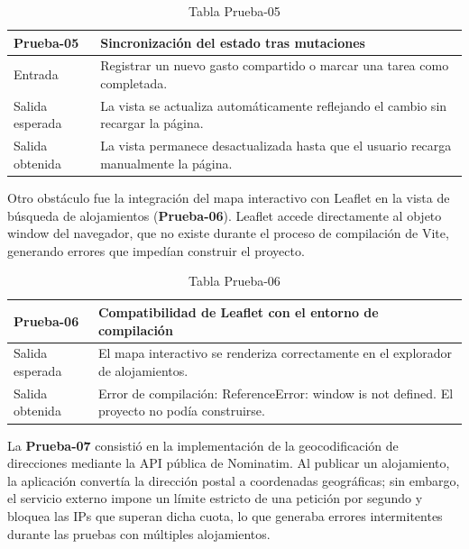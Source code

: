 \begin{table}[H]
\centering
\begin{tabular}{|p{}|p{}|}
\hline
\textbf{Prueba-05} & \textbf{Sincronización del estado tras mutaciones} \\ \hline
Entrada & Registrar un nuevo gasto compartido o marcar una tarea como completada. \\ \hline
Salida esperada & La vista se actualiza automáticamente reflejando el cambio sin recargar la página. \\ \hline
Salida obtenida & La vista permanece desactualizada hasta que el usuario recarga manualmente la página. \\ \hline
\end{tabular}
\caption{Tabla Prueba-05}
\label{tab:prueba05}
\end{table}

Otro obstáculo fue la integración del mapa interactivo con Leaflet en la vista de búsqueda de alojamientos (\textbf{Prueba-06}). Leaflet accede directamente al objeto window del navegador, que no existe durante el proceso de compilación de Vite, generando errores que impedían construir el proyecto.

\begin{table}[H]
\centering
\begin{tabular}{|p{}|p{}|}
\hline
\textbf{Prueba-06} & \textbf{Compatibilidad de Leaflet con el entorno de compilación} \\ \hline
Salida esperada & El mapa interactivo se renderiza correctamente en el explorador de alojamientos. \\ \hline
Salida obtenida & Error de compilación: ReferenceError: window is not defined. El proyecto no podía construirse. \\ \hline
\end{tabular}
\caption{Tabla Prueba-06}
\label{tab:prueba06}
\end{table}

La \textbf{Prueba-07} consistió en la implementación de la geocodificación de direcciones mediante la API pública de Nominatim. Al publicar un alojamiento, la aplicación convertía la dirección postal a coordenadas geográficas; sin embargo, el servicio externo impone un límite estricto de una petición por segundo y bloquea las IPs que superan dicha cuota, lo que generaba errores intermitentes durante las pruebas con múltiples alojamientos.

